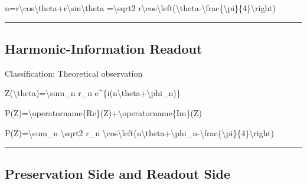 \documentclass[
  a4paper,
]{article}
\newenvironment{Shaded}{}{}
\newcommand{\NormalTok}[1]{#1}
\begin{document}
\begin{Shaded}
\begin{Highlighting}[]
\NormalTok{u=r\textbackslash{}cos\textbackslash{}theta+r\textbackslash{}sin\textbackslash{}theta}
\NormalTok{=\textbackslash{}sqrt2 r\textbackslash{}cos\textbackslash{}left(\textbackslash{}theta{-}\textbackslash{}frac\{\textbackslash{}pi\}\{4\}\textbackslash{}right)}
\end{Highlighting}
\end{Shaded}

\begin{center}\rule{0.5\linewidth}{0.5pt}\end{center}

\subsection{Harmonic-Information
Readout}\label{harmonic-information-readout}

Classification: Theoretical observation

\begin{Shaded}
\begin{Highlighting}[]
\NormalTok{Z(\textbackslash{}theta)=\textbackslash{}sum\_n r\_n e\^{}\{i(n\textbackslash{}theta+\textbackslash{}phi\_n)\}}
\end{Highlighting}
\end{Shaded}

\begin{Shaded}
\begin{Highlighting}[]
\NormalTok{P(Z)=\textbackslash{}operatorname\{Re\}(Z)+\textbackslash{}operatorname\{Im\}(Z)}
\end{Highlighting}
\end{Shaded}

\begin{Shaded}
\begin{Highlighting}[]
\NormalTok{P(Z)=\textbackslash{}sum\_n \textbackslash{}sqrt2 r\_n}
\NormalTok{\textbackslash{}cos\textbackslash{}left(n\textbackslash{}theta+\textbackslash{}phi\_n{-}\textbackslash{}frac\{\textbackslash{}pi\}\{4\}\textbackslash{}right)}
\end{Highlighting}
\end{Shaded}

\begin{center}\rule{0.5\linewidth}{0.5pt}\end{center}

\subsection{Preservation Side and Readout
Side}\label{preservation-side-and-readout-side}
\end{document}
